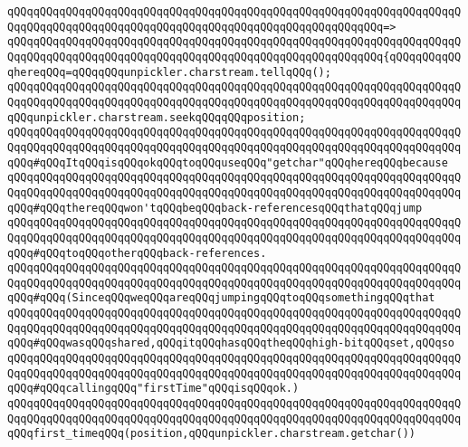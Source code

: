 \verb|qQQqqQQqqQQqqQQqqQQqqQQqqQQqqQQqqQQqqQQqqQQqqQQqqQQqqQQqqQQqqQQqqQQqqQQqqQQqqQQqqQQqqQQqqQQqqQQqqQQqqQQqqQQqqQQqqQQqqQQqqQQqqQQq=>|\newline
\verb|qQQqqQQqqQQqqQQqqQQqqQQqqQQqqQQqqQQqqQQqqQQqqQQqqQQqqQQqqQQqqQQqqQQqqQQqqQQqqQQqqQQqqQQqqQQqqQQqqQQqqQQqqQQqqQQqqQQqqQQqqQQqqQQq{qQQqqQQqqQQqhereqQQq=qQQqqQQqunpickler.charstream.tellqQQq();|\newline
\newline
\verb|qQQqqQQqqQQqqQQqqQQqqQQqqQQqqQQqqQQqqQQqqQQqqQQqqQQqqQQqqQQqqQQqqQQqqQQqqQQqqQQqqQQqqQQqqQQqqQQqqQQqqQQqqQQqqQQqqQQqqQQqqQQqqQQqqQQqqQQqqQQqqQQqunpickler.charstream.seekqQQqqQQqposition;|\newline
\newline
\verb|qQQqqQQqqQQqqQQqqQQqqQQqqQQqqQQqqQQqqQQqqQQqqQQqqQQqqQQqqQQqqQQqqQQqqQQqqQQqqQQqqQQqqQQqqQQqqQQqqQQqqQQqqQQqqQQqqQQqqQQqqQQqqQQqqQQqqQQqqQQqqQQq#qQQqItqQQqisqQQqokqQQqtoqQQquseqQQq"getchar"qQQqhereqQQqbecause|\newline
\verb|qQQqqQQqqQQqqQQqqQQqqQQqqQQqqQQqqQQqqQQqqQQqqQQqqQQqqQQqqQQqqQQqqQQqqQQqqQQqqQQqqQQqqQQqqQQqqQQqqQQqqQQqqQQqqQQqqQQqqQQqqQQqqQQqqQQqqQQqqQQqqQQq#qQQqthereqQQqwon'tqQQqbeqQQqback-referencesqQQqthatqQQqjump|\newline
\verb|qQQqqQQqqQQqqQQqqQQqqQQqqQQqqQQqqQQqqQQqqQQqqQQqqQQqqQQqqQQqqQQqqQQqqQQqqQQqqQQqqQQqqQQqqQQqqQQqqQQqqQQqqQQqqQQqqQQqqQQqqQQqqQQqqQQqqQQqqQQqqQQq#qQQqtoqQQqotherqQQqback-references.|\newline
\verb|qQQqqQQqqQQqqQQqqQQqqQQqqQQqqQQqqQQqqQQqqQQqqQQqqQQqqQQqqQQqqQQqqQQqqQQqqQQqqQQqqQQqqQQqqQQqqQQqqQQqqQQqqQQqqQQqqQQqqQQqqQQqqQQqqQQqqQQqqQQqqQQq#qQQq(SinceqQQqweqQQqareqQQqjumpingqQQqtoqQQqsomethingqQQqthat|\newline
\verb|qQQqqQQqqQQqqQQqqQQqqQQqqQQqqQQqqQQqqQQqqQQqqQQqqQQqqQQqqQQqqQQqqQQqqQQqqQQqqQQqqQQqqQQqqQQqqQQqqQQqqQQqqQQqqQQqqQQqqQQqqQQqqQQqqQQqqQQqqQQqqQQq#qQQqwasqQQqshared,qQQqitqQQqhasqQQqtheqQQqhigh-bitqQQqset,qQQqso|\newline
\verb|qQQqqQQqqQQqqQQqqQQqqQQqqQQqqQQqqQQqqQQqqQQqqQQqqQQqqQQqqQQqqQQqqQQqqQQqqQQqqQQqqQQqqQQqqQQqqQQqqQQqqQQqqQQqqQQqqQQqqQQqqQQqqQQqqQQqqQQqqQQqqQQq#qQQqcallingqQQq"firstTime"qQQqisqQQqok.)|\newline
\newline
\verb|qQQqqQQqqQQqqQQqqQQqqQQqqQQqqQQqqQQqqQQqqQQqqQQqqQQqqQQqqQQqqQQqqQQqqQQqqQQqqQQqqQQqqQQqqQQqqQQqqQQqqQQqqQQqqQQqqQQqqQQqqQQqqQQqqQQqqQQqqQQqqQQqfirst_timeqQQq(position,qQQqunpickler.charstream.getchar())|\newline
